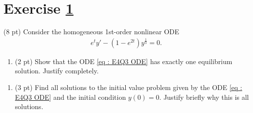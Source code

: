 




%
%
%
%


\section{Exercise \ref{sec : Math211 Summer2019 Exam4 Q3}}
\label{sec : Math211 Summer2019 Exam4 Q3}

(8 pt) Consider the homogeneous 1st-order nonlinear ODE
\begin{align}
e^{t} y' - (1 - e^{2 t}) y^{\frac{1}{3}}
=
0.%
\label{eq : E4Q3 ODE}
\end{align}



\begin{enumerate}[label=(\alph*)]
\item\label{itm : E4Q3a} (2 pt) Show that the ODE \eqref{eq : E4Q3 ODE} has exactly one equilibrium solution. Justify completely.
\end{enumerate}




\begin{enumerate}[resume,label=(\alph*)]
\item\label{itm : E4Q3b} (3 pt) Find all solutions to the initial value problem given by the ODE \eqref{eq : E4Q3 ODE} and the initial condition $y(0) = 0$. Justify briefly why this is all solutions.
\end{enumerate}

